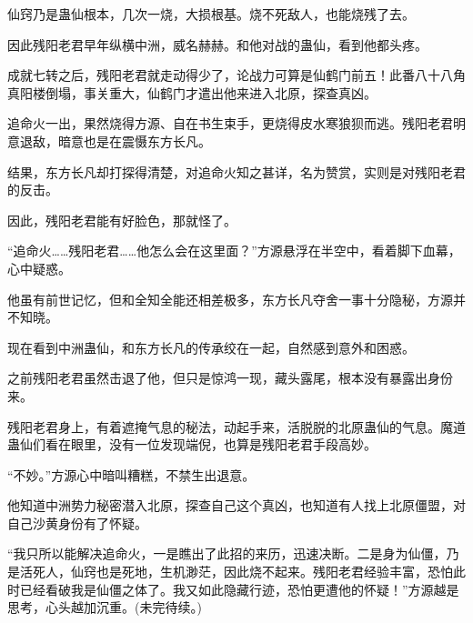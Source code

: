 \begin{this_body}
仙窍乃是蛊仙根本，几次一烧，大损根基。烧不死敌人，也能烧残了去。

因此残阳老君早年纵横中洲，威名赫赫。和他对战的蛊仙，看到他都头疼。

成就七转之后，残阳老君就走动得少了，论战力可算是仙鹤门前五！此番八十八角真阳楼倒塌，事关重大，仙鹤门才遣出他来进入北原，探查真凶。

追命火一出，果然烧得方源、自在书生束手，更烧得皮水寒狼狈而逃。残阳老君明意退敌，暗意也是在震慑东方长凡。

结果，东方长凡却打探得清楚，对追命火知之甚详，名为赞赏，实则是对残阳老君的反击。

因此，残阳老君能有好脸色，那就怪了。

“追命火……残阳老君……他怎么会在这里面？”方源悬浮在半空中，看着脚下血幕，心中疑惑。

他虽有前世记忆，但和全知全能还相差极多，东方长凡夺舍一事十分隐秘，方源并不知晓。

现在看到中洲蛊仙，和东方长凡的传承绞在一起，自然感到意外和困惑。

之前残阳老君虽然击退了他，但只是惊鸿一现，藏头露尾，根本没有暴露出身份来。

残阳老君身上，有着遮掩气息的秘法，动起手来，活脱脱的北原蛊仙的气息。魔道蛊仙们看在眼里，没有一位发现端倪，也算是残阳老君手段高妙。

“不妙。”方源心中暗叫糟糕，不禁生出退意。

他知道中洲势力秘密潜入北原，探查自己这个真凶，也知道有人找上北原僵盟，对自己沙黄身份有了怀疑。

“我只所以能解决追命火，一是瞧出了此招的来历，迅速决断。二是身为仙僵，乃是活死人，仙窍也是死地，生机渺茫，因此烧不起来。残阳老君经验丰富，恐怕此时已经看破我是仙僵之体了。我又如此隐藏行迹，恐怕更遭他的怀疑！”方源越是思考，心头越加沉重。(未完待续。)

\end{this_body}

